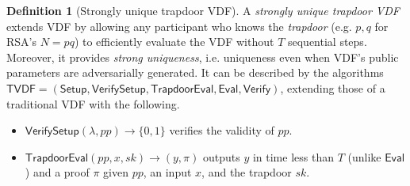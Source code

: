 \documentclass[conference]{IEEEtran}
\theoremstyle{definition}
\newtheorem{definition}[theorem]{Definition}
\theoremstyle{remark}
\begin{document}
\begin{definition}[Strongly unique trapdoor VDF]
A \textit{strongly unique trapdoor VDF} extends VDF by allowing any participant who knows the \textit{trapdoor} (e.g. $p, q$ for RSA's $N = p q$) to efficiently evaluate the VDF without $T$ sequential steps. Moreover, it provides \textit{strong uniqueness}, i.e. uniqueness even when VDF's public parameters are adversarially generated. It can be described by the algorithms $\mathsf{TVDF} = (\mathsf{Setup}, \mathsf{VerifySetup}, \mathsf{TrapdoorEval}, \mathsf{Eval}, \mathsf{Verify})$, extending those of a traditional VDF with the following.
\begin{itemize}
    \item $\mathsf{VerifySetup}(\lambda, pp) \rightarrow \{0, 1\}$ verifies the validity of $pp$.
    \item $\mathsf{TrapdoorEval}(pp, x, sk) \rightarrow (y, \pi)$ outputs $y$ in time less than $T$ (unlike $\mathsf{Eval}$) and a proof $\pi$ given $pp$, an input $x$, and the trapdoor $sk$.
\end{itemize}
\end{definition}
\end{document}
